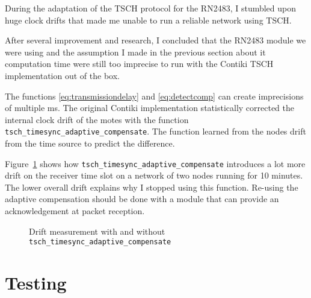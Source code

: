 During the adaptation of the TSCH protocol for the RN2483, I stumbled upon huge
clock drifts that made me unable to run a reliable network using TSCH.

After several improvement and research, I concluded that the RN2483
module we were using and the assumption I made in the previous section about it
computation time were still too imprecise to run with the Contiki TSCH
implementation out of the box.

The functions \ref{eq:transmissiondelay} and \ref{eq:detectcomp} can
create imprecisions of multiple ms.
The original Contiki implementation statistically corrected the internal clock
drift of the motes with the function
\lstinline{tsch_timesync_adaptive_compensate}.
The function learned from the nodes drift from the time source to predict the
difference.

Figure~\ref{fig:driftmeasurement} shows how
\lstinline{tsch_timesync_adaptive_compensate} introduces a lot more drift on the
receiver time slot on a network of two nodes running for 10 minutes.
The lower overall drift explains why I stopped using this function.
Re-using the adaptive compensation should be done with a module that can
provide an acknowledgement at packet reception.

\begin{figure}[H]
  \centering
  \caption{Drift measurement with and without \lstinline{tsch_timesync_adaptive_compensate}\label{fig:driftmeasurement}}
\end{figure}

\section{Testing\label{section:tschtesting}}

